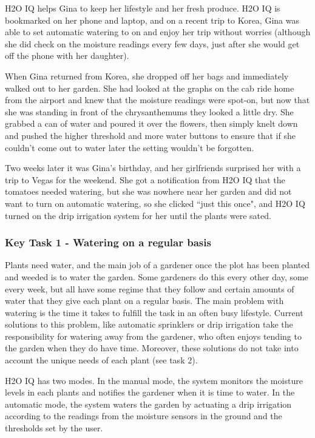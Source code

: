 \documentclass[11pt]{article}
\begin{document}
H2O IQ helps Gina to keep her lifestyle and her fresh produce.  H2O IQ is bookmarked on her phone and laptop, and on a recent trip to Korea, Gina was able to set automatic watering to on and enjoy her trip without worries (although she did check on the moisture readings every few days, just after she would get off the phone with her daughter).

When Gina returned from Korea, she dropped off her bags and immediately walked out to her garden.  She had looked at the graphs on the cab ride home from the airport and knew that the moisture readings were spot-on, but now that she was standing in front of the chrysanthemums they looked a little dry.  She grabbed a can of water and poured it over the flowers, then simply knelt down and pushed the higher threshold and more water buttons to ensure that if she couldn't come out to water later the setting wouldn't be forgotten.

Two weeks later it was Gina's birthday, and her girlfriends surprised her with a trip to Vegas for the weekend.  She got a notification from H2O IQ that the tomatoes needed watering, but she was nowhere near her garden and did not want to turn on automatic watering, so she clicked ``just this once", and H2O IQ turned on the drip irrigation system for her until the plants were sated.

\subsubsection{Key Task 1 - Watering on a regular basis}
Plants need water, and the main job of a gardener once the plot has been planted and weeded is to water the garden. Some gardeners do this every other day, some every week, but all have some regime that they follow and certain amounts of water that they give each plant on a regular basis. The main problem with watering is the time it takes to fulfill the task in an often busy lifestyle. Current solutions to this problem, like automatic sprinklers or drip irrigation take the responsibility for watering away from the gardener, who often enjoys tending to the garden when they do have time. Moreover, these solutions do not take into account the unique needs of each plant (see task 2).

H2O IQ has two modes. In the manual mode, the system monitors the moisture levels in each plants and notifies the gardener when it is time to water. In the automatic mode, the system waters the garden by actuating a drip irrigation according to the readings from the moisture sensors in the ground and the thresholds set by the user.
\end{document}
